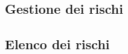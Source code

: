 \documentclass[../piano-di-progetto.tex]{subfiles}
\begin{document}
\subsection{Gestione dei rischi}%
\label{sub:gestione_dei_rischi}

\subsection{Elenco dei rischi}%
\label{sub:elenco_dei_rischi}

\end{document}
